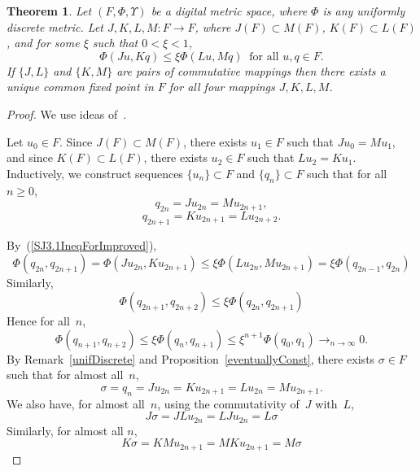 \documentclass{article}
\newtheorem{thm}{Theorem}
\numberwithin{thm}{section}
\begin{document}
\begin{thm}
    \label{improvedSalJhade3.1}
    Let $(F,\Phi,\Upsilon)$
    be a digital
    metric space, where
    $\Phi$ is any uniformly discrete 
    metric. Let
    $J,K,L,M: F \to F$,
    where $J(F) \subset M(F)$, 
    $K(F) \subset L(F)$, and for some $\xi$
    such that $0 < \xi < 1$,
    \begin{equation}
    \label{SJ3.1IneqForImproved}
 \Phi(Ju,Kq) \le
       \xi \Phi(Lu,Mq)
       ~\mbox{ for all } u,q \in F.
    \end{equation}
 If $\{J,L\}$ and $\{K, M\}$ are pairs
of commutative mappings then there exists a unique common fixed point
in $F$ for all four mappings $J, K, L, M$.
\end{thm}

\begin{proof}
    We use ideas of~\cite{SalJhade22}.

    Let $u_0 \in F$.
    Since $J(F) \subset M(F)$, there exists
    $u_1 \in F$ such that
    $Ju_0 = Mu_1$, and
    since $K(F) \subset L(F)$, there exists
    $u_2 \in F$ such that $Lu_2 = Ku_1$.
    Inductively, we
    construct sequences
    $\{u_n\} \subset F$
    and $\{q_n\} \subset F$ such
    that for all~$n \ge 0$,
    \[ q_{2n} = Ju_{2n} = Mu_{2n+1},
    \]
    \[ q_{2n+1} =Ku_{2n+1}= Lu_{2n+2}.
    \]

    By~(\ref{SJ3.1IneqForImproved}),
    \[ \Phi(q_{2n},q_{2n+1}) = \Phi(Ju_{2n},Ku_{2n+1}) \le 
    \xi \Phi(Lu_{2n},Mu_{2n+1}) =
    \xi \Phi(q_{2n-1},q_{2n})    
    \]
    Similarly,
    \[ \Phi(q_{2n+1},q_{2n+2}) \le \xi \Phi(q_{2n},q_{2n+1})
    \]
    Hence for all~$n$,
    \[ \Phi(q_{n+1},q_{n+2}) \le \xi \Phi(q_{n},q_{n+1}) \le \xi^{n+1} \Phi(q_0,q_1)
    \to_{n \to \infty} 0.
    \]
    By Remark~\ref{unifDiscrete} and
    Proposition~\ref{eventuallyConst}, there
    exists $\sigma \in F$ such that for
    almost all~$n$, 
    \begin{equation}
        \label{seqsConverge}
        \sigma = q_n = 
        Ju_{2n} = Ku_{2n+1} = 
        Lu_{2n} = Mu_{2n+1}.
    \end{equation}
    We also have, for almost all~$n$,
    using the commutativity of~$J$ with~$L$,
    \begin{equation}
        \label{Jsig=Lsig}
        J \sigma = JLu_{2n} = LJu_{2n} = L \sigma
    \end{equation}
    Similarly, for almost all $n$,
    \begin{equation}
        \label{Ksig=Msig}
        K\sigma = KMu_{2n+1} =
        MKu_{2n+1} =
        M\sigma
    \end{equation}


\end{proof}
\end{document}

